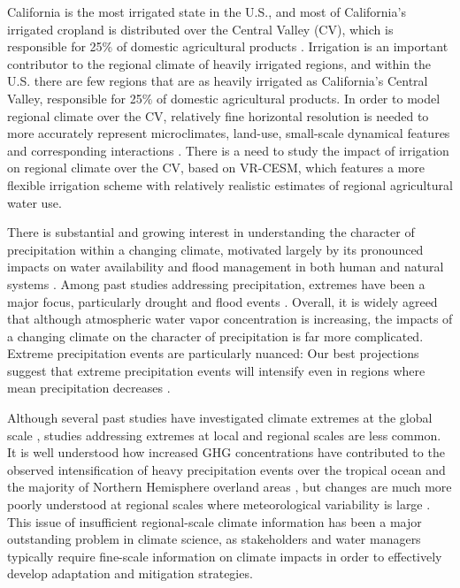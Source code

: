 California is the most irrigated state in the U.S., and most of California's irrigated cropland is distributed over the Central Valley (CV), which is responsible for 25$\%$ of domestic agricultural products \cite{wilkinson2002potential}. Irrigation is an important contributor to the regional climate of heavily irrigated regions, and within the U.S. there are few regions that are as heavily irrigated as California's Central Valley, responsible for 25$\%$ of domestic agricultural products. In order to model regional climate over the CV, relatively fine horizontal resolution is needed to more accurately represent microclimates, land-use, small-scale dynamical features and corresponding interactions \cite{leung2003regional, rauscher2010resolution}.  There is a need to study the impact of irrigation on regional climate over the CV, based on VR-CESM, which features a more flexible irrigation scheme with relatively realistic estimates of regional agricultural water use.

There is substantial and growing interest in understanding the character of precipitation within a changing climate, motivated largely by its pronounced impacts on water availability and flood management in both human and natural systems \cite{hegerl2004detectability, kharin2007changes, scoccimarro2013heavy}.  Among past studies addressing precipitation, extremes have been a major focus, particularly drought and flood events \cite{seneviratne2012changes}.  Overall, it is widely agreed that although atmospheric water vapor concentration is increasing, the impacts of a changing climate on the character of precipitation is far more complicated.  Extreme precipitation events are particularly nuanced:  Our best projections suggest that extreme precipitation events will intensify even in regions where mean precipitation decreases \cite{tebaldi2006going, kharin2007changes}.

Although several past studies have investigated climate extremes at the global scale \cite{seneviratne2012changes}, studies addressing extremes at local and regional scales are less common. It is well understood how increased GHG concentrations have contributed to the observed intensification of heavy precipitation events over the tropical ocean \cite{allan2008atmospheric} and the majority of Northern Hemisphere overland areas \cite{min2011human}, but changes are much more poorly understood at regional scales where meteorological variability is large \cite{trenberth2011changes}. This issue of insufficient regional-scale climate information has been a major outstanding problem in climate science, as stakeholders and water managers typically require fine-scale information on climate impacts in order to effectively develop adaptation and mitigation strategies. 

